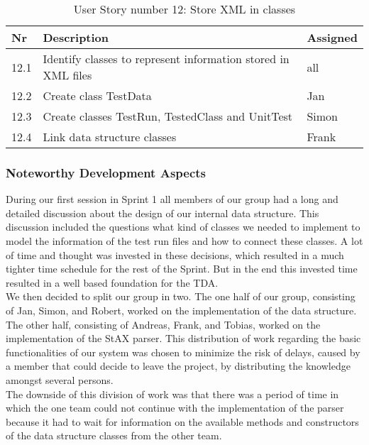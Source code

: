 \newpage

\begin{table}[h]
  \caption{User Story number 12: Store XML in classes}
  \label{US_Storage}
  \centering
  \begin{tabular}{p{1cm}|p{5cm}|p{3cm}|}
  	Nr & Description & Assigned \\ 
  	\hline
  	12.1 & Identify classes to represent information stored in XML files & all \\ 
  	\hline
  	12.2 & Create class TestData & Jan \\ 
  	\hline
  	12.3 & Create classes TestRun, TestedClass and UnitTest & Simon \\ 
  	\hline
  	12.4 & Link data structure classes & Frank \\ 
  	\hline
  \end{tabular}
\end{table} 

\subsubsection*{Noteworthy Development Aspects}

During our first session in Sprint 1 all members of our group had a long and detailed discussion about the design of our internal data structure. This discussion included the questions what kind of classes we needed to implement to model the information of the test run files and how to connect these classes. A lot of time and thought was invested in these decisions, which resulted in a much tighter time schedule for the rest of the Sprint. But in the end this invested time resulted in a well based foundation for the TDA. \\ 

We then decided to split our group in two. The one half of our group, consisting of Jan, Simon, and Robert, worked on the implementation of the data structure. The other half, consisting of Andreas, Frank, and Tobias, worked on the implementation of the StAX parser. This distribution of work regarding the basic functionalities of our system was chosen to minimize the risk of delays, caused by a member that could decide to leave the project, by distributing the knowledge amongst several persons. \\ 

The downside of this division of work was that there was a period of time in which the one team could not continue with the implementation of the parser because it had to wait for information on the available methods and constructors of the data structure classes from the other team. \\ 

